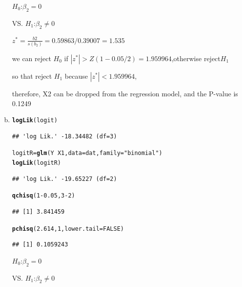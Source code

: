 \documentclass{article}\usepackage[]{graphicx}\usepackage[]{color}
\makeatletter
\newcommand{\hlnum}[1]{\textcolor[rgb]{0.686,0.059,0.569}{#1}}%
\newcommand{\hlstr}[1]{\textcolor[rgb]{0.192,0.494,0.8}{#1}}%
\newcommand{\hlopt}[1]{\textcolor[rgb]{0,0,0}{#1}}%
\newcommand{\hlstd}[1]{\textcolor[rgb]{0.345,0.345,0.345}{#1}}%
\newcommand{\hlkwb}[1]{\textcolor[rgb]{0.69,0.353,0.396}{#1}}%
\newcommand{\hlkwc}[1]{\textcolor[rgb]{0.333,0.667,0.333}{#1}}%
\newcommand{\hlkwd}[1]{\textcolor[rgb]{0.737,0.353,0.396}{\textbf{#1}}}%
\newenvironment{kframe}{%
 \def\at@end@of@kframe{}%
 \ifinner\ifhmode%
  \def\at@end@of@kframe{\end{minipage}}%
  \begin{minipage}{\columnwidth}%
 \fi\fi%
 \def\FrameCommand##1{\hskip\@totalleftmargin \hskip-\fboxsep
 \colorbox{shadecolor}{##1}\hskip-\fboxsep
     \hskip-\linewidth \hskip-\@totalleftmargin \hskip\columnwidth}%
 \MakeFramed {\advance\hsize-\width
   \@totalleftmargin\z@ \linewidth\hsize
   \@setminipage}}%
 {\par\unskip\endMakeFramed%
 \at@end@of@kframe}
\newenvironment{knitrout}{}{} %
\makeatother
\begin{document}
\begin{enumerate}[(a)]
\begin{center}
$H_0$:$\beta_2=0$

VS. $H_1$:$\beta_2 \ne 0$

$z^*=\frac{b2}{s(b_2)} = 0.59863/0.39007   = 1.535$

we can reject $H_0$ if $|z^*| > Z(1-0.05/2)=1.959964$,otherwise reject$H_1$

so that reject $H_1$ because $|z^*|<1.959964$,

therefore, X2 can be dropped from the regression model, and the P-value is 0.1249 
\end{center}

\item

\begin{knitrout}
\color{fgcolor}\begin{kframe}
\begin{alltt}
  \hlkwd{logLik}\hlstd{(logit)}
\end{alltt}
\begin{verbatim}
## 'log Lik.' -18.34482 (df=3)
\end{verbatim}
\begin{alltt}
  \hlstd{logitR} \hlkwb{=} \hlkwd{glm}\hlstd{(Y} \hlopt{~} \hlstd{X1,} \hlkwc{data} \hlstd{= dat,} \hlkwc{family} \hlstd{=} \hlstr{"binomial"}\hlstd{)}
  \hlkwd{logLik}\hlstd{(logitR)}
\end{alltt}
\begin{verbatim}
## 'log Lik.' -19.65227 (df=2)
\end{verbatim}
\begin{alltt}
  \hlkwd{qchisq}\hlstd{(}\hlnum{1}\hlopt{-}\hlnum{0.05}\hlstd{,} \hlnum{3}\hlopt{-}\hlnum{2}\hlstd{)}
\end{alltt}
\begin{verbatim}
## [1] 3.841459
\end{verbatim}
\begin{alltt}
  \hlkwd{pchisq}\hlstd{(}\hlnum{2.614}\hlstd{,} \hlnum{1}\hlstd{,} \hlkwc{lower.tail} \hlstd{=} \hlnum{FALSE}\hlstd{)}
\end{alltt}
\begin{verbatim}
## [1] 0.1059243
\end{verbatim}
\end{kframe}
\end{knitrout}

\begin{center}
$H_0$:$\beta_2=0$

VS. $H_1$:$\beta_2 \ne 0$


\end{center}
\end{enumerate}
\end{document}
